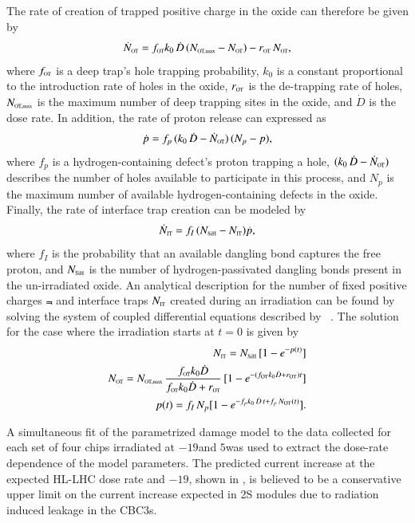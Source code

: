The rate of creation of trapped positive charge in the oxide can therefore be given by
\begin{equation}
\dot N_{\mbox{\tiny{OT}}} = f_{\mbox{\tiny{OT}}}k_0\,\dot D\,(N_{\mbox{\tiny{OT,max}}} - N_{\mbox{\tiny{OT}}})- r_{\mbox{\tiny{OT}}}\,N_{\mbox{\tiny{OT}}} ,
\label{eq:Not_TrappingRate}
\end{equation}
where $f_{\mbox{\tiny{OT}}}$ is a deep trap's hole trapping probability, ${k_0}$ is a constant proportional to the introduction rate of holes in the oxide, $r_{\mbox{\tiny{OT}}}$ is the de-trapping rate of holes, $N_{\mbox{\tiny{OT,max}}}$ is the maximum number of deep trapping sites in the oxide, and ${\dot D}$ is the dose rate. In addition, the rate of proton release can expressed as 
\begin{equation}
\dot p = f_p\,(k_0\,\dot D - \dot N_{\mbox{\tiny{OT}}})\,(N_p - p),
\label{eq:Proton_ReleaseRate}
\end{equation}
where ${f_p}$ is a hydrogen-containing defect's proton trapping a hole, ${(k_0\,\dot D - \dot N_{\mbox{\tiny{OT}}})}$ describes the number of holes available to participate in this process, and ${N_p}$ is the maximum number of available hydrogen-containing defects in the oxide. Finally, the rate of interface trap creation can be modeled by 
\begin{equation}
\dot N_{\mbox{\tiny{IT}}} = f_I\,(N_{\mbox{\tiny{SiH}}} - N_{\mbox{\tiny{IT}}}) \dot p, 
\label{eq:Nit_TrappingRate_0}
\end{equation}
 where ${f_I}$ is the probability that an available dangling bond captures the free proton, and $N_{\mbox{\tiny{SiH}}}$ is the number of hydrogen-passivated dangling bonds present in the un-irradiated oxide. An analytical description for the number of fixed positive charges $\Not$ and interface traps $N_{\mbox{\tiny{IT}}}$ created during an irradiation can be found by solving the system of coupled differential equations described by ~. The solution for the case where the irradiation starts at ${t=0}$ is given by
\begin{eqnarray}
N_{\mbox{\tiny{IT}}} = N_{\mbox{\tiny{SiH}}}\,[1 - e^{- p(t)}] \\ 
N_{\mbox{\tiny{OT}}} = N_{\mbox{\tiny{OT,max}}}\,\frac{f_{\mbox{\tiny{OT}}} k_0 \dot D}{f_{\mbox{\tiny{OT}}} k_0 \dot D + r_{\mbox{\tiny{OT}}}}\,[1 - e^{-(f_{\mbox{\tiny{OT}}} k_0 \dot D + r_{\mbox{\tiny{OT}}})t}] \\
p(t) = f_I\,N_p[ 1 - e^{-f_p k_0\,\dot D\,t + f_p\,N_{\mbox{\tiny{OT}}}(t)} ].
\label{eq:Solution_DifferentialEquations}
\end{eqnarray}

A simultaneous fit of the parametrized damage model to the data collected for each set of four chips irradiated at $-19$\deg and $5$\deg was used to extract the dose-rate dependence of the model parameters. The predicted current increase at the expected HL-LHC dose rate and $-19$\deg, shown in , is believed to be a conservative upper limit on the current increase expected in 2S modules due to radiation induced leakage in the CBC3s. 

